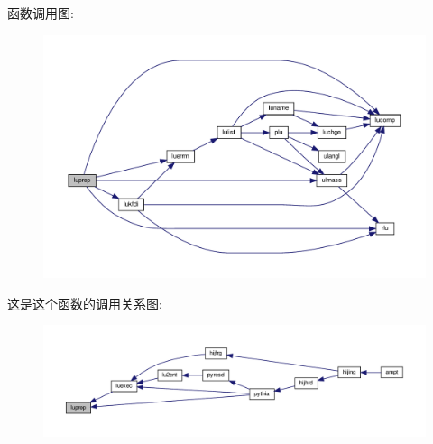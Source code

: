 函数调用图\+:
\nopagebreak
\begin{figure}[H]
\begin{center}
\leavevmode
\includegraphics[width=350pt]{luprep_8f90_a84218764eaa8561b110ac40ee6532d54_cgraph}
\end{center}
\end{figure}
这是这个函数的调用关系图\+:
\nopagebreak
\begin{figure}[H]
\begin{center}
\leavevmode
\includegraphics[width=350pt]{luprep_8f90_a84218764eaa8561b110ac40ee6532d54_icgraph}
\end{center}
\end{figure}
